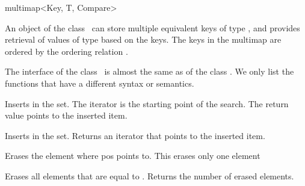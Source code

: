 
\ccHtmlNoClassLinks
\begin{ccClassTemplate} {multimap<Key, T, Compare>}


\ccDefinition
An object of the class \ccClassTemplateName\ can store multiple
equivalent keys of type , and provides retrieval of
values of type  based on the keys. The keys in the multimap
are ordered by the ordering relation .

The interface of the class \ccClassTemplateName\ is almost the same as of
the class . We only list the functions 
that have a different syntax or semantics.


\ccTypes
{}




\ccOperations
{}
{Inserts  in the set. The iterator  is the starting 
 point of  the search.  The return value points to the inserted item.}

{Inserts  in the set. Returns an iterator that points to the 
 inserted item.}

{Erases the element where pos points to. This erases only one element}

{Erases all  elements that are equal to . Returns the number
 of erased elements.}

\end{ccClassTemplate} 
